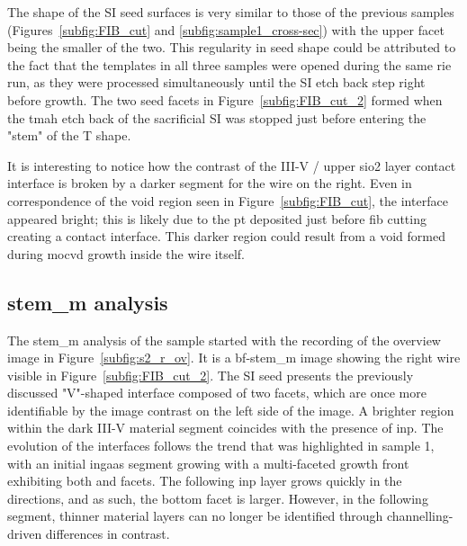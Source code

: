 The shape of the \acl{SI} seed surfaces is very similar to those of the previous samples (Figures~\ref{subfig:FIB_cut} and \ref{subfig:sample1_cross-sec}) with the upper  facet being the smaller of the two. This regularity in seed shape could be attributed to the fact that the templates in all three samples were opened during the same \acf{rie} run, as they were processed simultaneously until the \acl{SI} etch back step right before growth. The two seed facets in Figure~\ref{subfig:FIB_cut_2} formed when the \acs{tmah} etch back of the sacrificial \acl{SI} was stopped just before entering the "stem" of the T shape. 

It is interesting to notice how the contrast of the III-V / upper \acs{sio2} layer contact interface is broken by a darker segment for the wire on the right. Even in correspondence of the void region seen in Figure~\ref{subfig:FIB_cut}, the interface appeared bright; this is likely due to the \acl{pt} deposited just before \acs{fib} cutting creating a contact interface. This darker region could result from a void formed during \acs{mocvd} growth inside the wire itself.

\subsection{\texorpdfstring{\acs{stem_m} analysis}{STEM analysis}}

The \acs{stem_m} analysis of the sample started with the recording of the overview image in Figure~\ref{subfig:s2_r_ov}. It is a \acs{bf}-\acs{stem_m} image showing the right wire visible in Figure~\ref{subfig:FIB_cut_2}. The \acl{SI} seed presents the previously discussed "V"-shaped interface composed of two  facets, which are once more identifiable by the image contrast on the left side of the image. A brighter region within the dark III-V material segment coincides with the presence of \acs{inp}. The evolution of the interfaces follows the trend that was highlighted in sample 1, with an initial \acs{ingaas} segment growing with a multi-faceted growth front exhibiting both  and  facets. The following \acs{inp} layer grows quickly in the  directions, and as such, the bottom  facet is larger. However, in the following segment, thinner material layers can no longer be identified through channelling-driven differences in contrast.

